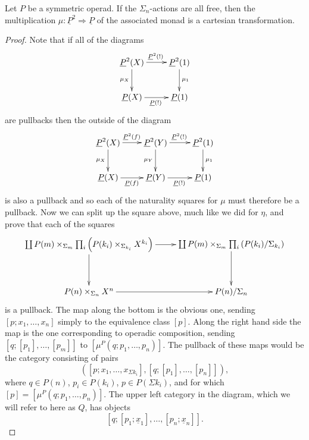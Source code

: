 \documentclass{amsbook} %
\numberwithin{section}{chapter}
\begin{document}
\begin{prop}
Let $P$ be a symmetric operad.  If the $\Sigma_n$-actions are all free, then the multiplication $\mu: \underline{P}^{2} \Rightarrow \underline{P}$ of the associated monad is a cartesian transformation.
\end{prop}
\begin{proof}
Note that if all of the diagrams
    \[
        \xy
            (0,0)*+{\underline{P}^2(X)}="00";
            (20,0)*+{\underline{P}^2(1)}="10";
            (0,-15)*+{\underline{P}(X)}="01";
            (20,-15)*+{\underline{P}(1)}="11";
            {\ar^{\underline{P}^2(!)} "00" ; "10"};
            {\ar^{\mu_1} "10" ; "11"};
            {\ar_{\mu_X} "00" ; "01"};
            {\ar_{\underline{P}(!)} "01" ; "11"};
        \endxy
    \]
are pullbacks then the outside of the diagram
    \[
        \xy
            (0,0)*+{\underline{P}^2(X)}="00";
            (20,0)*+{\underline{P}^2(Y)}="10";
            (40,0)*+{\underline{P}^2(1)}="20";
            (0,-15)*+{\underline{P}(X)}="01";
            (20,-15)*+{\underline{P}(Y)}="11";
            (40,-15)*+{\underline{P}(1)}="21";
            {\ar^{\underline{P}^2(f)} "00" ; "10"};
            {\ar^{\underline{P}^2(!)} "10" ; "20"};
            {\ar^{\mu_{1}} "20" ; "21"};
            {\ar_{\mu_X} "00" ; "01"};
            {\ar_{\underline{P}(f)} "01" ; "11"};
            {\ar_{\underline{P}(!)} "11" ; "21"};
            {\ar_{\mu_Y} "10" ; "11"};
        \endxy
    \]
is also a pullback and so each of the naturality squares for $\mu$ must therefore be a pullback. Now we can split up the square above, much like we did for $\eta$, and prove that each of the squares
    \[
        \xy
            (0,0)*+{\coprod P(m) \times_{\Sigma_m} \prod_i \left(P(k_i) \times_{\Sigma_{k_i}} X^{k_i}\right)}="00";
            (60,0)*+{\coprod P(m) \times_{\Sigma_m} \prod_i \left(P(k_i) / \Sigma_{k_i}\right)}="10";
            (0,-20)*+{P(n) \times_{\Sigma_{n}} X^n}="01";
            (60,-20)*+{P(n) / \Sigma_{n}}="11";
            {\ar "00" ; "10"};
            {\ar "00" ; "01"};
            {\ar "01" ; "11"};
            {\ar "10" ; "11"};
        \endxy
    \]
is a pullback. The map along the bottom is the obvious one, sending $[p; x_1, \ldots, x_n]$ simply to the equivalence class $[p]$. Along the right hand side the map is the one corresponding to operadic composition, sending $[q;[p_1],\ldots,[p_m]]$ to $[\mu^P(q;p_1,\ldots,p_n)]$. The pullback of these maps would be the category consisting of pairs
    \[
        \left([p;x_1,\ldots,x_{\Sigma k_i}],[q;[p_1],\ldots,[p_n]]\right),
    \]
where $q \in P(n)$, $p_i \in P(k_i)$, $p \in P(\Sigma k_i)$, and for which $[p] = [\mu^P(q;p_1,\ldots,p_n)]$. The upper left category in the diagram, which we will refer to here as $Q$, has objects
    \[
        [q;[p_1;\underline{x}_1],\ldots,[p_n;\underline{x}_n]].
    \]


\end{proof}
\end{document}
